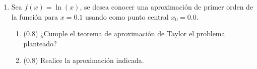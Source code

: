\documentclass[12pt]{article}
\begin{document}
\begin{enumerate}[leftmargin=*,widest=9]
\begin{enumerate}[label=\alph*]
\vspace{0.5cm}
\end{enumerate}
   \item Sea \(f(x) = \ln(x)\), se desea conocer una aproximación de primer orden de la función para \(x=0.1\) usando como punto central \(x_0=0.0\).
   \begin{enumerate}[label=\alph*]
    \item (\(0.8\)) ¿Cumple el teorema de aproximación de Taylor el problema planteado?
\vspace{3cm}
\item (\(0.8\)) Realice la aproximación indicada.
\vspace{3cm}
  \end{enumerate}
\end{enumerate}
\end{document}
